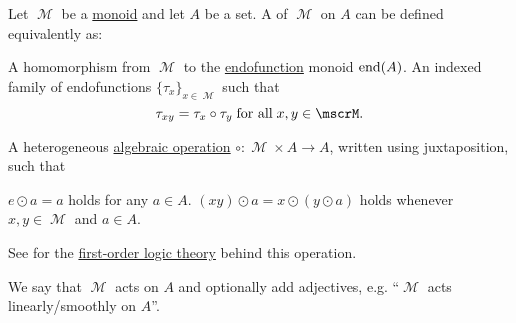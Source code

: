 \begin{definition}\label{def:left_monoid_action}
  Let \( \mscrM \) be a \hyperref[def:unital_magma/associative]{monoid} and let \( A \) be a set. A  of \( \mscrM \) on \( A \) can be defined equivalently as:
  \begin{thmenum}
     A homomorphism from \( \mscrM \) to the \hyperref[def:endofunction]{endofunction} monoid \( \operatorname{end}(A) \).
     An indexed family of endofunctions \( \{ \tau_x \}_{x \in \mscrM} \) such that
    \begin{equation}\label{eq:def:left_monoid_action/indirect_homomorphism}
      \tau_{xy} = \tau_x \circ \tau_y \T{for all} x, y \in \mscrM.
    \end{equation}

     A heterogeneous \hyperref[def:magma]{algebraic operation} \( \circ: \mscrM \times A \to A \), written using juxtaposition, such that
    \begin{thmenum}
       \( e \odot a = a \) holds for any \( a \in A \).
       \( (xy) \odot a = x \odot (y \odot a) \) holds whenever \( x, y \in \mscrM \) and \( a \in A \).
    \end{thmenum}

    See  for the \hyperref[def:first_order_theory]{first-order logic theory} behind this operation.
  \end{thmenum}

  We say that \( \mscrM \) acts on \( A \) and optionally add adjectives, e.g. \enquote{\( \mscrM \) acts linearly/smoothly on \( A \)}.
\end{definition}
